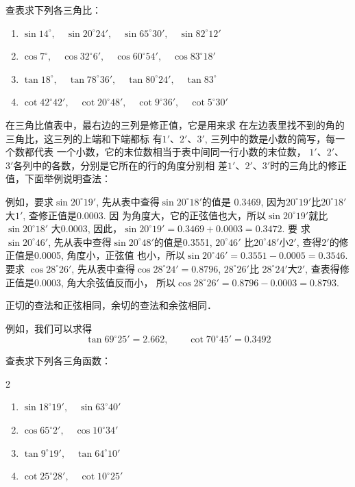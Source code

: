 \begin{ex}
    查表求下列各三角比：
\begin{enumerate}
    \item $\sin14^{\circ},\quad \sin20^{\circ}24',\quad \sin65^{\circ}30',\quad \sin82^{\circ}12'$
    \item $\cos7^{\circ},\quad  \cos32^{\circ}6',\quad  \cos60^{\circ}54',\quad \cos83^{\circ}18'$
    \item $\tan 18^{\circ},\quad  \tan 78^{\circ}36',\quad  \tan 80^{\circ}24',\quad  \tan 83^{\circ}$
    \item $\cot 42^{\circ}42',\quad   \cot20^{\circ}48', \quad  \cot9^{\circ}36', \quad  \cot 5^{\circ}30'$
\end{enumerate}
\end{ex}

在三角比值表中，最右边的三列是修正值，它是用来求
在左边表里找不到的角的三角比，这三列的上端和下端都标
有$1'$、$2'$、$3'$, 三列中的数是小数的简写，每一个数都代表
一个小数，它的末位数相当于表中间同一行小数的末位数，
$1'$、$2'$、$3'$各列中的各数，分别是它所在的行的角度分别相
差$1'$、$2'$、$3'$时的三角比的修正值，下面举例说明查法：

例如，要求$\sin20^{\circ}19'$, 先从表中查得$\sin20^{\circ}18'$的值是
0.3469, 因为$20^{\circ}19'$比$20^{\circ}18'$大$1'$, 查修正值是0.0003. 因
为角度大，它的正弦值也大，所以$\sin20^{\circ}19'$就比$\sin20^{\circ}18'$
大0.0003, 因此，$\sin20^{\circ}19'=0.3469+0.0003=0.3472$. 要
求$\sin20^{\circ}46'$, 先从表中查得$\sin20^{\circ}48'$的值是0.3551, $20^{\circ}46'$
比$20^{\circ}48'$小$2'$, 查得$2'$的修正值是0.0005, 角度小，正弦值
也小，所以$\sin20^{\circ}46'=0.3551-0.0005=0.3546$. 要求
$\cos28^{\circ}26'$, 先从表中查得$\cos28^{\circ}24'=0.8796$, $28^{\circ}26'$比
$28^{\circ}24'$大$2'$, 查表得修正值是0.0003, 角大余弦值反而小，
所以$\cos28^{\circ}26'=0.8796-0.0003=0.8793$. 

正切的查法和正弦相同，余切的查法和余弦相同．

例如，我们可以求得
\[\tan 69^{\circ}25'=2.662,\qquad \cot 70^{\circ}45'=0.3492\]

\begin{ex}
    查表求下列各三角函数：
\begin{multicols}{2}
    \begin{enumerate}
        \item $\sin18^{\circ}19',\quad  \sin63^{\circ}40'$
        \item $\cos65^{\circ}2',\quad  \cos10^{\circ}34'$
        \item $\tan 9^{\circ}19',\quad  \tan64^{\circ}10'$
        \item $\cot25^{\circ}28',\quad  \cot10^{\circ}25'$
    \end{enumerate}
\end{multicols}
\end{ex}


